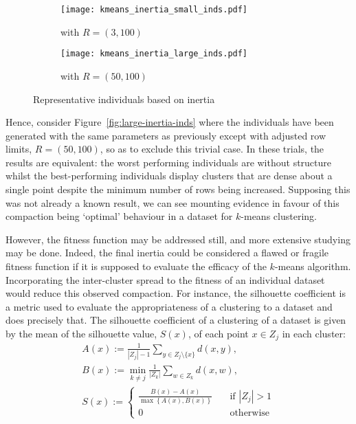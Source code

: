 \begin{figure}[htbp]
    \centering
    \begin{subfigure}{\imgwidth}
        \texttt{[image: kmeans\_inertia\_small\_inds.pdf]}
        \caption{with \(R = (3, 100)\)}\label{fig:kmeans_inertia_small_inds}
    \end{subfigure}

    \begin{subfigure}{\imgwidth}
        \texttt{[image: kmeans\_inertia\_large\_inds.pdf]}
        \caption{with \(R = (50, 100)\)}\label{fig:kmeans_inertia_large_inds}
    \end{subfigure}
    \caption{%
        Representative individuals based on inertia
    }\label{fig:inertia-inds}
\end{figure}

Hence, consider Figure~\ref{fig:large-inertia-inds} where the individuals have
been generated with the same parameters as previously except with adjusted row
limits, \(R = (50, 100)\), so as to exclude this trivial case. In these trials,
the results are equivalent: the worst performing individuals are without
structure whilst the best-performing individuals display clusters that are dense
about a single point despite the minimum number of rows being increased.
Supposing this was not already a known result, we can see mounting evidence in
favour of this compaction being `optimal' behaviour in a dataset for \(k\)-means
clustering.

However, the fitness function may be addressed still, and more extensive
studying may be done. Indeed, the final inertia could be considered a flawed or
fragile fitness function if it is supposed to evaluate the efficacy of the
\(k\)-means algorithm. Incorporating the inter-cluster spread to the fitness
of an individual dataset would reduce this observed compaction. For instance,
the silhouette coefficient is a metric used to evaluate the appropriateness of a
clustering to a dataset and does precisely that. The silhouette coefficient of a
clustering of a dataset is given by the mean of the silhouette value,
\(S(x)\), of each point \(x \in Z_j\) in each cluster:
\begin{equation}
    \begin{gathered}
        A(x) := \frac{1}{|Z_j| - 1} \sum_{y \in Z_j \setminus \{x\}} d(x, y),
        \\
        B(x) := \min_{k \neq j} \frac{1}{|Z_k|} \sum_{w \in Z_k} d(x, w),
        \\
        S(x) :=
            \begin{cases}
                \frac{B(x) - A(x)}{\max\left\{A(x), B(x)\right\}}
                &\quad \text{if } |Z_j| > 1\\
                0 &\quad \text{otherwise}
            \end{cases}
    \end{gathered}\label{eq:silhouette}
\end{equation}\\

